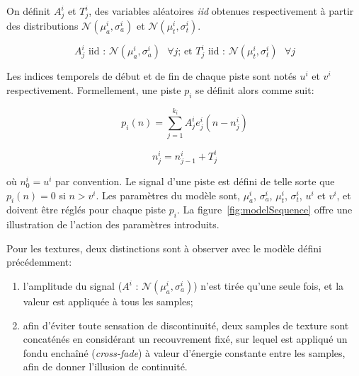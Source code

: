 On définit $A^i_j$ et $T^i_j$, des variables aléatoires \emph{iid} obtenues respectivement à partir des distributions $\mathcal{N}(\mu_a^{i},\sigma_a^{i})$ et $\mathcal{N}({\mu_t^{i},\sigma_t^{i}})$.

\begin{equation}
A_j^i \textrm{ iid : } \mathcal{N}(\mu_a^{i},\sigma_a^{i}) \textrm{ } \forall j \textrm{; et } T_j^i \textrm{ iid : } \mathcal{N}({\mu_t^{i},\sigma_t^{i}}) \textrm{ } \forall j
\end{equation}

Les indices temporels de début et de fin de chaque piste sont notés $u^i$ et $v^i$ respectivement. Formellement, une piste $p_i$ se définit alors comme suit:
 
\begin{equation}
\label{eq:ch4_eq1}
p_{i}(n)= \sum_{j=1}^{k_i} A_j^i e_j^i(n-n_j^i)
\end{equation}

\begin{equation}
\label{eq:ch4_eq2}
n_j^i=n_{j-1}^i + T_j^i
\end{equation}

où $n^i_0=u^i$ par convention. Le signal d'une piste est défini de telle sorte que $p_i(n)=0$ si $n>v^i$. Les paramètres du modèle sont, $\mu_a^i$,  $\sigma_a^i$,   $\mu_t^i$,  $\sigma_t^i$, $u^i$ et $v^i$, et doivent être réglés pour chaque piste $p_i$. La figure~\ref{fig:modelSequence} offre une illustration de l'action des paramètres introduits.

Pour les textures, deux distinctions sont à observer avec le modèle défini précédemment: 

\begin{enumerate}
\item l'amplitude du signal ($A^i \textrm{ : } \mathcal{N}(\mu_a^{i},\sigma_a^{i})$) n'est tirée qu'une seule fois, et la valeur est appliquée à tous les samples;
\item afin d'éviter toute sensation de discontinuité, deux samples de texture sont concaténés en considérant un recouvrement fixé, sur lequel est appliqué un fondu enchaîné (\emph{cross-fade}) à valeur d'énergie constante entre les samples, afin de donner l'illusion de continuité.
\end{enumerate}

